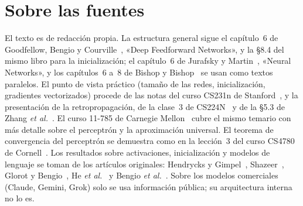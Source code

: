 \documentclass[11pt,a4paper,twoside,openany]{book}
\begin{document}
\section*{Sobre las fuentes}
El texto es de redacción propia. La estructura general sigue el capítulo~6 de Goodfellow, Bengio y Courville~\cite{gbc}, «Deep Feedforward Networks», y la §8.4 del mismo libro para la inicialización; el capítulo~6 de Jurafsky y Martin~\cite{jm3}, «Neural Networks», y los capítulos~6 a~8 de Bishop y Bishop~\cite{bishopdl} se usan como textos paralelos. El punto de vista práctico (tamaño de las redes, inicialización, gradientes vectorizados) procede de las notas del curso CS231n de Stanford~\cite{cs231n}, y la presentación de la retropropagación, de la clase~3 de CS224N~\cite{cs224n} y de la §5.3 de Zhang \emph{et al.}~\cite{d2l}. El curso 11-785 de Carnegie Mellon~\cite{cmu11785} cubre el mismo temario con más detalle sobre el perceptrón y la aproximación universal. El teorema de convergencia del perceptrón se demuestra como en la lección~3 del curso CS4780 de Cornell~\cite{cs4780}. Los resultados sobre activaciones, inicialización y modelos de lenguaje se toman de los artículos originales: Hendrycks y Gimpel~\cite{hendrycks}, Shazeer~\cite{shazeer}, Glorot y Bengio~\cite{glorot}, He \emph{et al.}~\cite{he} y Bengio \emph{et al.}~\cite{bengio}. Sobre los modelos comerciales (Claude, Gemini, Grok) solo se usa información pública; su arquitectura interna no lo es.
\end{document}
